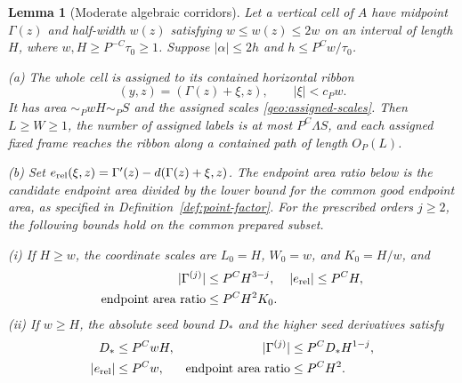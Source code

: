 \documentclass[11pt]{amsart}
\newtheorem{lemma}[theorem]{Lemma}
\theoremstyle{definition}
\theoremstyle{remark}
\numberwithin{equation}{section}
\begin{document}
\begin{lemma}[Moderate algebraic corridors]\label{geo:moderate}
Let a vertical cell of $A$ have midpoint $\Gamma(z)$ and half-width $w(z)$ satisfying $w\le w(z)\le2w$ on an interval of length $H$, where $w,H\ge P^{-C}\tau_0\ge1$. Suppose $|\alpha|\le2h$ and $h\le P^Cw/\tau_0$.

\noindent\textup{(a)} The whole cell is assigned to its contained horizontal ribbon
\begin{equation}\label{geo:moderate-ribbon}
(y,z)=(\Gamma(z)+\xi,z),\qquad |\xi|<c_Pw.
\end{equation}
It has area $\sim_P wH\sim_P S$ and the assigned scales \eqref{geo:assigned-scales}. Then $L\ge W\ge1$, the number of assigned labels is at most $P^C\Lambda S$, and each assigned fixed frame reaches the ribbon along a contained path of length $O_P(L)$.

\noindent\textup{(b)} Set $e_{\rm rel}(\xi,z)=\Gamma^\prime(z)-d(\Gamma(z)+\xi,z)$. The endpoint area ratio below is the candidate endpoint area divided by the lower bound for the common good endpoint area, as specified in Definition~\ref{def:point-factor}. For the prescribed orders $j\ge2$, the following bounds hold on the common prepared subset.

\textup{(i)} If $H\ge w$, the coordinate scales are $L_0=H$, $W_0=w$, and $K_0=H/w$, and
\[
\begin{aligned}
|\Gamma^{(j)}|&\le P^CH^{3-j},&|e_{\rm rel}|&\le P^CH,\\
\text{endpoint area ratio}&\le P^CH^2K_0.
\end{aligned}
\]
\textup{(ii)} If $w\ge H$, the absolute seed bound $D_*$ and the higher seed derivatives satisfy
\[
\begin{aligned}
D_*&\le P^CwH,&|\Gamma^{(j)}|&\le P^CD_*H^{1-j},\\
|e_{\rm rel}|&\le P^Cw,&\text{endpoint area ratio}&\le P^CH^2.
\end{aligned}
\]
\end{lemma}
\end{document}
